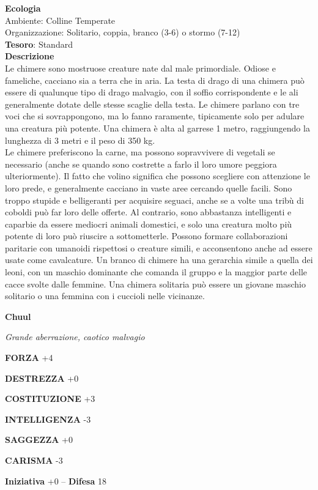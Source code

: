 \begin{multicols}{2}
	\textbf{Ecologia}\\
	Ambiente: Colline Temperate\\
	Organizzazione: Solitario, coppia, branco (3-6) o stormo (7-12)\\
	\textbf{Tesoro}: Standard\\
	\textbf{Descrizione}\\
	Le chimere sono mostruose creature nate dal male primordiale. Odiose e fameliche, cacciano sia a terra che in aria. La testa di drago di una chimera può essere di qualunque tipo di drago malvagio, con il soffio corrispondente e le ali generalmente dotate delle stesse scaglie della testa. Le chimere parlano con tre voci che si sovrappongono, ma lo fanno raramente, tipicamente solo per adulare una creatura più potente. Una chimera è alta al garrese 1 metro, raggiungendo la lunghezza di 3 metri e il peso di 350 kg.\\
	Le chimere preferiscono la carne, ma possono sopravvivere di vegetali se necessario (anche se quando sono costrette a farlo il loro umore peggiora ulteriormente). Il fatto che volino significa che possono scegliere con attenzione le loro prede, e generalmente cacciano in vaste aree cercando quelle facili. Sono troppo stupide e belligeranti per acquisire seguaci, anche se a volte una tribù di coboldi può far loro delle offerte. Al contrario, sono abbastanza intelligenti e caparbie da essere mediocri animali domestici, e solo una creatura molto più potente di loro può riuscire a sottometterle. Possono formare collaborazioni paritarie con umanoidi rispettosi o creature simili, e acconsentono anche ad essere usate come cavalcature. Un branco di chimere ha una gerarchia simile a quella dei leoni, con un maschio dominante che comanda il gruppo e la maggior parte delle cacce svolte dalle femmine. Una chimera solitaria può essere un giovane maschio solitario o una femmina con i cuccioli nelle vicinanze.


	\medskip{}\textbf{Chuul}

	\textit{Grande aberrazione, caotico malvagio}

	\textbf{FORZA} +4

	\textbf{DESTREZZA} +0

	\textbf{COSTITUZIONE} +3

	\textbf{INTELLIGENZA} -3

	\textbf{SAGGEZZA} +0

	\textbf{CARISMA} -3

	\textbf{Iniziativa} +0 -- \textbf{Difesa} 18


\end{multicols}

